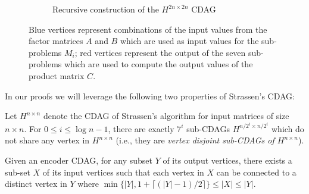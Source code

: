 \documentclass[a4paper,UKenglish]{lipics-v2016}
\begin{document}
\begin{figure}[bt]
\begin{subfigure}{.49\textwidth}
{
     }
     \caption{Recursive construction of the $H^{2n\times 2n}$ CDAG}
     \label{fig:strarec}
  \end{subfigure}

  \caption{Blue vertices represent combinations of the input values from the factor matrices $A$ and $B$ which are used as input values for the sub-problems $M_i$; red vertices represent the output of the seven sub-problems which are used to compute the output values of the product matrix $C$.}
\end{figure} 

In our proofs we will leverage the following two properties of Strassen's CDAG:
\begin{lemma}\label{lem:disictness_sub_cdag}
Let $H^{n \times n}$  denote the CDAG of Strassen's algorithm for input matrices of size $n \times n$. For $0 \leq i \leq \log n-1$, there are exactly $7^i$ sub-CDAGs $H^{n/2^i \times n/2^i}$ which do not share any vertex in $H^{n \times n}$ (i.e., they are \emph{vertex disjoint sub-CDAGs of $H^{n \times n}$}).
\end{lemma}
\begin{lemma}\label{lem:conneconder}
Given an encoder CDAG, for any subset $Y$ of its output vertices, there exists a sub-set $X$ of its input vertices such that each vertex in $X$ can be connected to a distinct vertex in $Y$ where $\min\{|Y|, 1 + \lceil\left(|Y|-1\right)/2\rceil \}\leq |X|\leq |Y|$.
\end{lemma}
\end{document}
